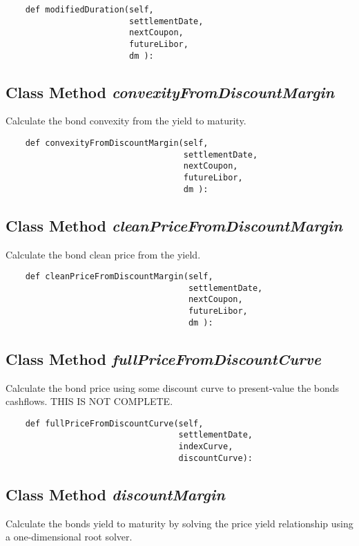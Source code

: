 \documentclass[twoside,11pt]{book}
\begin{document}
\begin{lstlisting}
    def modifiedDuration(self,
                         settlementDate,
                         nextCoupon,
                         futureLibor,
                         dm ):
\end{lstlisting}

\subsection{Class Method {\it convexityFromDiscountMargin}}
Calculate the bond convexity from the yield to maturity. 

\begin{lstlisting}
    def convexityFromDiscountMargin(self, 
                                    settlementDate,
                                    nextCoupon,
                                    futureLibor,
                                    dm ):
\end{lstlisting}

\subsection{Class Method {\it cleanPriceFromDiscountMargin}}
Calculate the bond clean price from the yield. 

\begin{lstlisting}
    def cleanPriceFromDiscountMargin(self, 
                                     settlementDate,
                                     nextCoupon,
                                     futureLibor,
                                     dm ):
\end{lstlisting}

\subsection{Class Method {\it fullPriceFromDiscountCurve}}
Calculate the bond price using some discount curve to present-value the bonds cashflows. THIS IS NOT COMPLETE. 

\begin{lstlisting}
    def fullPriceFromDiscountCurve(self, 
                                   settlementDate,
                                   indexCurve,
                                   discountCurve):
\end{lstlisting}

\subsection{Class Method {\it discountMargin}}
Calculate the bonds yield to maturity by solving the price yield relationship using a one-dimensional root solver. 
\end{document}

